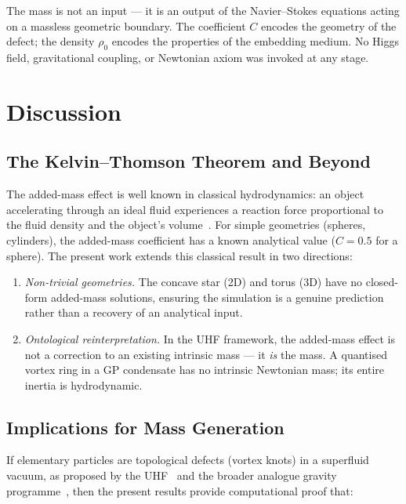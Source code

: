 \documentclass[reprint,amsmath,amssymb,aps,pre,floatfix]{revtex4-2}
\begin{document}
The mass is not an input --- it is an output of the Navier--Stokes
equations acting on a massless geometric boundary.  The coefficient $C$
encodes the geometry of the defect; the density $\rho_0$ encodes the
properties of the embedding medium.  No Higgs field, gravitational
coupling, or Newtonian axiom was invoked at any stage.

\section{Discussion}
\label{sec:discussion}

\subsection{The Kelvin--Thomson Theorem and Beyond}
\label{sec:kt}

The added-mass effect is well known in classical hydrodynamics: an object
accelerating through an ideal fluid experiences a reaction force
proportional to the fluid density and the object's
volume~\cite{Kelvin1868,Lamb1932}.  For simple geometries (spheres,
cylinders), the added-mass coefficient has a known analytical value
($C=0.5$ for a sphere).  The present work extends this classical result in
two directions:

\begin{enumerate}
\item \emph{Non-trivial geometries.}  The concave star (2D) and torus (3D)
  have no closed-form added-mass solutions, ensuring the simulation is a
  genuine prediction rather than a recovery of an analytical input.
\item \emph{Ontological reinterpretation.}  In the UHF framework, the
  added-mass effect is not a correction to an existing intrinsic mass ---
  it \emph{is} the mass.  A quantised vortex ring in a GP condensate has no
  intrinsic Newtonian mass; its entire inertia is hydrodynamic.
\end{enumerate}

\subsection{Implications for Mass Generation}
\label{sec:implications}

If elementary particles are topological defects (vortex knots) in a
superfluid vacuum, as proposed by the UHF~\cite{Amit2026} and the broader
analogue gravity programme~\cite{Unruh1981,Volovik2003}, then the present
results provide computational proof that:
\end{document}
